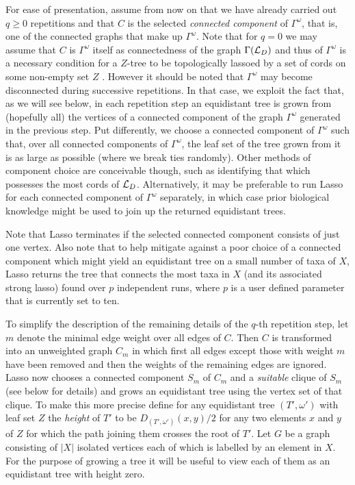 For ease of presentation, assume from now on that we have already carried out
$q\geq 0$ repetitions and that $C$ is the selected {\em connected component}
of $\Gamma^{\omega}$, that is, one of the connected graphs that make up
$\Gamma^{\omega}$.  Note that for $q=0$ we may assume that $C$ is
$\Gamma^{\omega}$ itself as connectedness of the graph $\Gamma({\mathcal L}_D)$ and
thus of $\Gamma^{\omega}$ is a necessary condition for a $Z$-tree to be
topologically lassoed by a set of cords on some non-empty set $Z$
\cite{huber13lassoing}.  However it should be noted that $\Gamma^{\omega}$ may become
disconnected during successive repetitions.  In that case, we exploit the fact
that, as we will see below, in each repetition step an equidistant tree is
grown from (hopefully all) the vertices of a connected component of the graph
$\Gamma^{\omega}$ generated in the previous step. Put differently, we choose a
connected component of $\Gamma^{\omega}$ such that, over all connected
components of $\Gamma^{\omega}$, the leaf set of the tree grown from it is as
large as possible (where we break ties randomly). Other methods of component
choice are conceivable though, such as identifying that which possesses the
most cords of ${\mathcal L}_D$.  Alternatively, it may be preferable to run {\sc Lasso}
for each connected component of $\Gamma^{\omega}$ separately, in which case
prior biological knowledge might be used to join up the returned equidistant
trees.

Note that {\sc Lasso} terminates if the selected connected component consists
of just one vertex.  Also note that to help mitigate against a poor choice of
a connected component which might yield an equidistant tree on a small number
of taxa of $X$, {\sc Lasso} returns the tree that connects the most taxa in
$X$ (and its associated strong lasso) found over $p$ independent runs, where
$p$ is a user defined parameter that is currently set to ten.


To simplify the description of the remaining details of the $q$-th repetition
step, let $m$ denote the minimal edge weight over all edges of $C$. Then $C$
is transformed into an unweighted graph $C_m$ in which first all edges except
those with weight $m$ have been removed and then the weights of the remaining
edges are ignored. {\sc Lasso} now chooses a connected component $S_m$ of
$C_m$ and a {\em suitable} clique of $S_m$ (see below for details) and grows
an equidistant tree using the vertex set of that clique. To make this more
precise define for any equidistant tree $(T',\omega')$ with leaf set $Z$ the
{\em height} of $T'$ to be $D_{(T',\omega')}(x,y)/2$ for any two elements $x$
and $y$ of $Z$ for which the path joining them crosses the root of $T'$.  Let
$G$ be a graph consisting of $|X|$ isolated vertices each of which is labelled
by an element in $X$. For the purpose of growing a tree it will be useful to
view each of them as an equidistant tree with height zero.

